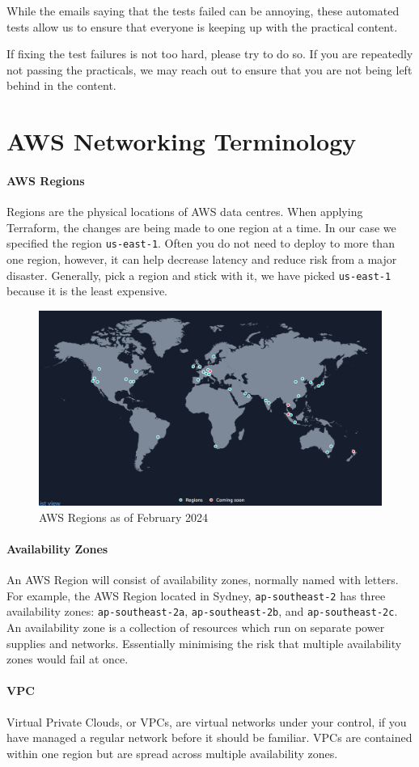 \documentclass{csse4400}
\begin{document}
While the emails saying that the tests failed can be annoying,
these automated tests allow us to ensure that everyone is keeping up with the practical content.

If fixing the test failures is not too hard,
please try to do so.
If you are repeatedly not passing the practicals,
we may reach out to ensure that you are not being left behind in the content.





\appendix

\section{AWS Networking Terminology}
\paragraph{AWS Regions}
Regions are the physical locations of AWS data centres.
When applying Terraform, the changes are being made to one region at a time.
In our case we specified the region \texttt{us-east-1}.
Often you do not need to deploy to more than one region, however,
it can help decrease latency and reduce risk from a major disaster.
Generally, pick a region and stick with it,
we have picked \texttt{us-east-1} because it is the least expensive.

\begin{figure}[ht]
\includegraphics[width=\textwidth]{images/aws_regions}
\caption{AWS Regions as of February 2024 \cite{aws-regions}}
\end{figure}

\paragraph{Availability Zones}
An AWS Region will consist of availability zones, normally named with letters.
For example, the AWS Region located in Sydney, \texttt{ap-southeast-2} has three availability zones:
\texttt{ap-southeast-2a}, \texttt{ap-southeast-2b}, and \texttt{ap-southeast-2c}.
An availability zone is a collection of resources which run on separate power supplies and networks.
Essentially minimising the risk that multiple availability zones would fail at once.

\paragraph{VPC}
Virtual Private Clouds, or VPCs,
are virtual networks under your control,
if you have managed a regular network before it should be familiar.
VPCs are contained within one region but are spread across multiple availability zones.
\end{document}
